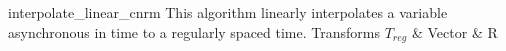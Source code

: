 
{ %
interpolate_linear_cnrm
}
{ %
This algorithm linearly interpolates a variable asynchronous in time to a regularly spaced time.  
}
{%
Transforms
}  
{ %
$T_{reg}$ & Vector & R
}
{ %

}
{ %

}
{ %

}
{ %

}


